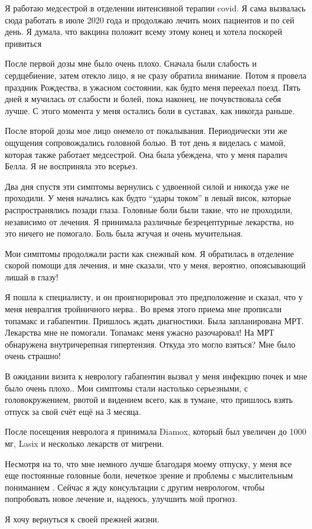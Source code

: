 Я работаю медсестрой в отделении интенсивной терапии covid. Я сама вызвалась
сюда работать в июле 2020 года и продолжаю лечить моих пациентов и по сей
день. Я думала, что вакцина положит всему этому конец и хотела поскорей
привиться

После первой дозы мне было очень плохо. Сначала были слабость и сердцебиение,
затем отекло лицо, я не сразу обратила внимание. Потом я провела праздник
Рождества, в ужасном состоянии, как будто меня переехал поезд. Пять дней я
мучилась от слабости и болей, пока наконец, не почувствовала себя лучше. С этого
момента у меня остались боли в суставах, как никогда раньше.

После второй дозы мое лицо онемело от покалывания. Периодически эти же ощущения
сопровождались головной болью. В тот день я виделась с мамой, которая также
работает медсестрой. Она была убеждена, что у меня паралич Белла. Я не
восприняла это всерьез.

Два дня спустя эти симптомы вернулись с удвоенной силой и никогда уже не
проходили. У меня начались как будто “удары током” в левый висок, которые
распространялись позади глаза. Головные боли были такие, что не проходили,
независимо от лечения. Я принимала различные безрецептурные лекарства, но это
ничего не помогало. Боль была жгучая и очень мучительная.

Мои симптомы продолжали расти как снежный ком. Я обратилась в отделение скорой
помощи для лечения, и мне сказали, что у меня, вероятно, опоясывающий лишай в
глазу!

Я пошла к специалисту, и он проигнорировал это предположение и сказал, что у
меня невралгия тройничного нерва.. Во время этого приема мне прописали топамакс
и габапентин. Пришлось ждать диагностики. Была запланирована МРТ. Лекарства мне
не помогали. Топамакс меня ужасно разочаровал! На МРТ обнаружена внутричерепная
гипертензия. Откуда это могло взяться? Мне было очень страшно!

В ожидании визита к неврологу габапентин вызвал у меня инфекцию почек и мне было
очень плохо.. Мои симптомы стали настолько серьезными, с головокружением, рвотой
и видением всего, как в тумане, что пришлось взять отпуск за свой счёт ещё на 3
месяца.

После посещения невролога я принимала Diamox, который был увеличен до 1000 мг,
Lasix и несколько лекарств от мигрени.

Несмотря на то, что мне немного лучше благодаря моему отпуску, у меня все еще
постоянные головные боли, нечеткое зрение и проблемы с мыслительным пониманием
. Сейчас я жду консультации с другим неврологом, чтобы попробовать новое лечение
и, надеюсь, улучшить мой прогноз.

Я хочу вернуться к своей прежней жизни.

